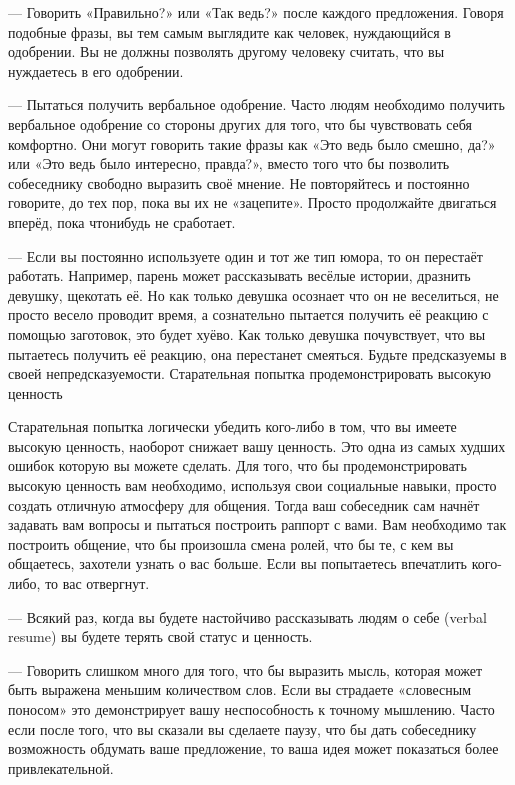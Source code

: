 --- Говорить «Правильно?» или «Так ведь?» после каждого предложения. Говоря подобные фразы, вы тем самым выглядите как человек, нуждающийся в одобрении. Вы не должны позволять другому человеку считать, что вы нуждаетесь в его одобрении.

--- Пытаться получить вербальное одобрение. Часто людям необходимо получить вербальное одобрение со стороны других для того, что бы чувствовать себя комфортно. Они могут говорить такие фразы как «Это ведь было смешно, да?» или «Это ведь было интересно, правда?», вместо того что бы позволить собеседнику свободно выразить своё мнение. Не повторяйтесь и постоянно говорите, до тех пор, пока вы их не «зацепите». Просто продолжайте двигаться вперёд, пока чтонибудь не сработает.

--- Если вы постоянно используете один и тот же тип юмора, то он перестаёт работать. Например, парень может рассказывать весёлые истории, дразнить девушку, щекотать её. Но как только девушка осознает что он не веселиться, не просто весело проводит время, а сознательно пытается получить её реакцию с помощью заготовок, это будет хуёво. Как только девушка почувствует, что вы пытаетесь получить её реакцию, она перестанет смеяться. Будьте предсказуемы в своей непредсказуемости.
Старательная попытка продемонстрировать высокую ценность

Старательная попытка логически убедить кого-либо в том, что вы имеете высокую ценность, наоборот снижает вашу ценность. Это одна из самых худших ошибок которую вы можете сделать. Для того, что бы продемонстрировать высокую ценность вам необходимо, используя свои социальные навыки, просто создать отличную атмосферу для общения. Тогда ваш собеседник сам начнёт задавать вам вопросы и пытаться построить раппорт с вами. Вам необходимо так построить общение, что бы произошла смена ролей, что бы те, с кем вы общаетесь, захотели узнать о вас больше. Если вы попытаетесь впечатлить кого-либо, то вас отвергнут.

--- Всякий раз, когда вы будете настойчиво рассказывать людям о себе (verbal resume) вы будете терять свой статус и ценность.

--- Говорить слишком много для того, что бы выразить мысль, которая может быть выражена меньшим количеством слов. Если вы страдаете «словесным поносом» это демонстрирует вашу неспособность к точному мышлению. Часто если после того, что вы сказали вы сделаете паузу, что бы дать собеседнику возможность обдумать ваше предложение, то ваша идея может показаться более привлекательной.

